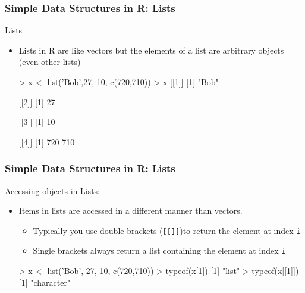 \documentclass{beamer}
\begin{document}
\begin{frame}[fragile]
  \frametitle{Simple Data Structures in R: Lists}

\Large{Lists}

\begin{itemize}

\item Lists in R are like vectors but the elements of a list are arbitrary objects (even other lists)

\begin{Rcode}
> x <- list('Bob',27, 10, c(720,710))
> x
[[1]]
[1] "Bob"

[[2]]
[1] 27

[[3]]
[1] 10

[[4]]
[1] 720 710
\end{Rcode}

\end{itemize}

\end{frame}

\begin{frame}[fragile]
  \frametitle{Simple Data Structures in R: Lists}

Accessing objects in Lists:

\begin{itemize}

\item Items in lists are accessed in a  different manner than vectors. 

\begin{itemize}
\item Typically you use double brackets (\texttt{[[]]})to return the element at index \texttt{i}

\item Single brackets always return a list containing the element at index \texttt{i}

\end{itemize}

\begin{Rcode}
> x <- list('Bob', 27, 10, c(720,710))
> typeof(x[1])
[1] "list"
> typeof(x[[1]])
[1] "character"
\end{Rcode}

\end{itemize}

\end{frame}
\end{document}
